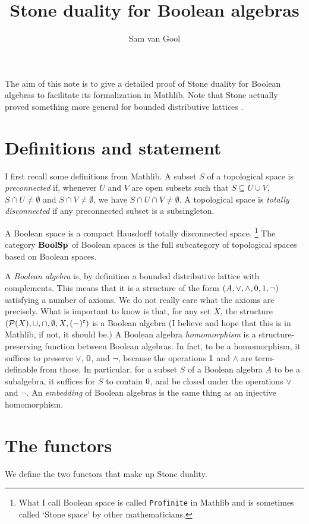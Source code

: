 \documentclass[a4paper]{article}
\title{Stone duality for Boolean algebras}
\author{Sam van Gool}
\begin{document}
\maketitle
The aim of this note is to give a detailed proof of Stone duality for Boolean
algebras \cite{Sto1937BA} to facilitate its formalization in Mathlib. Note that
Stone actually proved something more general for bounded distributive lattices
\cite{Sto1937}.

\section{Definitions and statement}
I first recall some definitions from Mathlib. A subset $S$ of a topological
space is \emph{preconnected} if, whenever $U$ and $V$ are open subsets such
that $S \subseteq U \cup V$, $S \cap U \neq \emptyset$ and $S \cap V \neq
\emptyset$, we have $S \cap U \cap V \neq \emptyset$. A topological space is
\emph{totally disconnected} if any preconnected subset is a subsingleton. 

A Boolean space is a compact Hausdorff totally disconnected space.%
\footnote{What I call Boolean space is called \texttt{Profinite} in Mathlib and
is sometimes called `Stone space' by other mathematicians.} The category
$\mathbf{BoolSp}$ of Boolean spaces is the full subcategory of topological spaces based
on Boolean spaces.

A \emph{Boolean algebra} is, by definition a bounded distributive lattice with
complements. This means that it is a structure of the form $(A, \vee, \wedge,
0, 1, \neg)$ satisfying a number of axioms. We do not really care what
the axioms are precisely. What is important to know is that, for any set $X$,
the structure $(\mathcal{P}(X), \cup, \cap, \emptyset, X, (-)^{\mathsf{c}})$ is a
Boolean algebra (I believe and hope that this is in Mathlib, if not, it should
be.) A Boolean algebra \emph{homomorphism} is a structure-preserving function
between Boolean algebras. In fact, to be a homomorphism, it suffices to
preserve $\vee$, $0$, and $\neg$, because the operations $1$ and $\wedge$
are term-definable from those. In particular, for a subset $S$ of a Boolean
algebra $A$ to be a subalgebra, it suffices for $S$ to contain $0$, and be
closed under the operations $\vee$ and $\neg$. An \emph{embedding} of Boolean
algebras is the same thing as an injective homomorphism.

\section{The functors}
We define the two functors that make up Stone duality.
\end{document}
